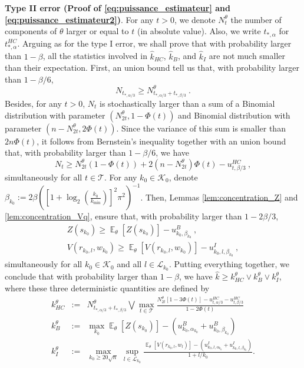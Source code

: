 \documentclass[twoside,11pt]{article}
\def\beqn{\begin{eqnarray*}}
\def\eeqn{\end{eqnarray*}}
\def\cK{\mathcal{K}}
\def\cL{\mathcal{L}}
\def\cT{\mathcal{T}}
\newcommand{\E}{\operatorname{\mathbb{E}}}
\newcommand{\<}{\langle}
\renewcommand{\>}{\rangle}
\begin{document}
 \noindent
 {\bf Type II error (Proof of \eqref{eq:puissance_estimateur} and \eqref{eq:puissance_estimateur2})}. 
For any $t>0$, we denote $N_t^{\theta}$ the number of components of $\theta$ larger or equal to $t$ (in absolute value). Also, we write $t_{*,\alpha}$ for  $t_{*,\alpha}^{HC}$. 
 Arguing as for the type I error, we shall prove that with probability larger than $1-\beta$, all the statistics involved in $\widehat{k}_{HC}$, $\widehat{k}_{B}$, and $\widehat{k}_{I}$ are not much smaller than their expectation. First, an union bound tell us that, with probability larger than $1-\beta/6$,
 \[
 N_{t_{*,\alpha/3}}\geq N^{\theta}_{t_{*,\alpha/3}+t_{*,\beta/3}}\ .
 \]
Besides, for any $t>0$, $N_t$ is stochastically larger than a sum of a Binomial distribution with parameter $(N_{2t}^{\theta}, 1-\Phi(t))$ and Binomial distribution with parameter $(n-N_{2t}^{\theta},2\Phi(t))$. Since the variance of this sum is smaller than $2n\Phi(t)$, it follows from Bernstein's inequality together with an union bound that, with probability larger than $1-\beta/6$, we have
\[
 N_t\geq N_{2t}^{\theta}(1-\Phi(t))+ 2(n-N_{2t}^{\theta})\Phi(t) - u_{t,\beta/3}^{HC}\ ,
\]
simultaneously for all $t\in \cT$.  For any $k_0\in \cK_0$, denote $\beta_{k_0}:= 2\beta([1+\log_2(\tfrac{k_0}{k_{\min}})]^2 \pi^2)^{-1}$. Then, Lemmas \ref{lem:concentration_Z} and \ref{lem:concentration_Vq}, ensure that, with probability larger than $1-2\beta/3$,
\beqn
Z(s_{k_0})\geq \E_{\theta}[Z(s_{k_0})] - u_{k_0,\beta_{k_0}}^B \ ,\\
V(r_{k_0,l},w_{k_0})\geq \E_{\theta}[V(r_{k_0,l},w_{k_0})] - u_{k_0,l,\beta_{k_0}}^I \ ,
\eeqn
simultaneously for all $k_0\in \cK_0$ and all $l\in \cL_{k_0}$. Putting everything together, we conclude that with probability larger than $1-\beta$, we have $\widehat{k}\geq k^{\theta}_{HC}\vee  k^{\theta}_{B}\vee  k^{\theta}_{I}$, where these three deterministic quantities are defined by
\begin{eqnarray}\label{eq:def_K_HC}
  k^{\theta}_{HC}&:=& N^{\theta}_{t_{*,\alpha/3}+t_{*,\beta/3}}\bigvee \max_{t\in \cT}\frac{N_{2t}^{\theta}[1-3\Phi(t)]-u_{t,\alpha/3}^{HC}-u_{t,\beta/3}^{HC}}{1-2\Phi(t)}\\ \label{eq:def_K_B}
  k^{\theta}_{B}&:=& \max_{k_0}\E_{\theta}[Z(s_{k_0})]- (u_{k_0,\alpha_{k_0}}^B  + u_{k_0,\beta_{k_0}}^B )\\ \label{eq:def_K_I}
  k^{\theta}_{I}&:=& \max_{k_0\geq 20\sqrt{n}}\,\sup_{l\in\cL_{k_0}}\frac{\E_{\theta}[V(r_{k_0,l},w_l)] -(u^I_{k_0,l,\alpha_{k_0}} + u^I_{k_0,l,\beta_{k_0}})}{1+l/k_0}.
\end{eqnarray}
\bigskip
\end{document}
